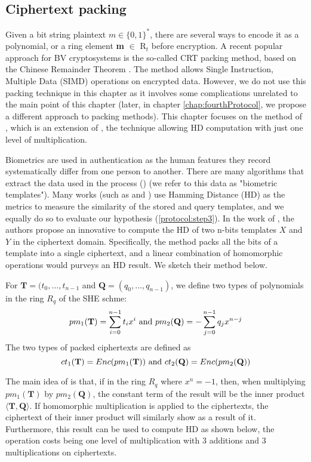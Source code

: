 \subsection{Ciphertext packing}
\label{sub:ciphertext_packing}
Given a bit string plaintext $m \in \{0,1\}^*$, there are several ways to encode
it as a polynomial, or a ring element \textbf{m} $\in$ R$_{t}$ before
encryption. A recent popular approach for BV cryptosystems is the so-called CRT
packing method, based on the Chinese Remainder Theorem
\cite{smart2014fully}. The method allows Single Instruction, Multiple Data
(SIMD) operations on encrypted data. However, we do not use this packing
technique in this chapter as it involves some complications unrelated to the
main point of this chapter (later, in chapter \ref{chap:fourthProtocol}, we
propose a different approach to packing methods). This chapter focuses on the
method of \cite{yasuda2014practical}, which is an extension of
\cite{naehrig2011can}, the technique allowing HD computation with just one level
of multiplication.

Biometrics are used in authentication as the human features they record
systematically differ from one person to another. There are many algorithms that
extract the data used in the process (\cite{FVConGoi2:online}) (we refer to this
data as "biometric templates"). Many works (such as \cite{daugman2003importance}
and \cite{FujitsuD7:online}) use Hamming Distance (HD) as the metrics to measure
the similarity of the stored and query templates, and we equally do so to
evaluate our hypothesis (\ref{protocol:step3}). In the work of
\cite{yasuda2014practical}, the authors propose an innovative to compute the HD
of two n-bits templates $X$ and $Y$ in the ciphertext domain. Specifically, the
method packs all the bits of a template into a single ciphertext, and a linear
combination of homomorphic operations would purveys an HD result. We sketch
their method below.
\begin{definition} 
  For $\mathbf{T} = (t_0, \dots, t_{n-1}$ and
  $\mathbf{Q} = (q_0, \dots, q_{n-1})$, we define two types of polynomials in
  the ring $R_q$ of the SHE schme:
  \[
    pm_1(\mathbf{T}) = \sum_{i=0}^{n-1}t_ix^i \ \textnormal{and} \
    pm_2(\mathbf{Q}) = - \sum_{j=0}^{n-1}q_jx^{n-j}
  \]
  The two types of packed ciphertexts are defined as
  \[
    ct_{1}(\mathbf{T}) = Enc(pm_1(\mathbf{T})) \ \textnormal{and} \
    ct_{2}(\mathbf{Q}) = Enc(pm_2(\mathbf{Q}))
  \]
\end{definition}
The main idea of \cite{yasuda2014practical} is that, if in the ring $R_q$ where
$x^n = -1$, then, when multiplying $pm_1(\mathbf{T})$ by $pm_2(\mathbf{Q})$, the
constant term of the result will be the inner product
$\langle \mathbf{T}, \mathbf{Q}\rangle$. If homomorphic multiplication is
applied to the ciphertexts, the ciphertext of their inner product will similarly
show as a result of it. Furthermore, this result can be used to compute HD as
shown below, the operation costs being one level of multiplication with 3
additions and 3 multiplications on ciphertexts.

